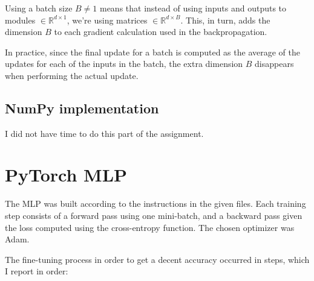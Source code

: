 \documentclass{article}
\begin{document}
\subsubsection{}

Using a batch size $B \neq 1$ means that instead of using inputs and outputs to modules $\in \mathbb{R}^{d \times 1}$, we're using matrices $\in \mathbb{R}^{d \times B}$. This, in turn, adds the dimension $B$ to each gradient calculation used in the backpropagation.

In practice, since the final update for a batch is computed as the average of the updates for each of the inputs in the batch, the extra dimension $B$ disappears when performing the actual update.

\subsection{NumPy implementation}

I did not have time to do this part of the assignment.

\section{PyTorch MLP}

The MLP was built according to the instructions in the given files. Each training step consists of a forward pass using one mini-batch, and a backward pass given the loss computed using the cross-entropy function. The chosen optimizer was Adam.

The fine-tuning process in order to get a decent accuracy occurred in steps, which I report in order:
\end{document}

